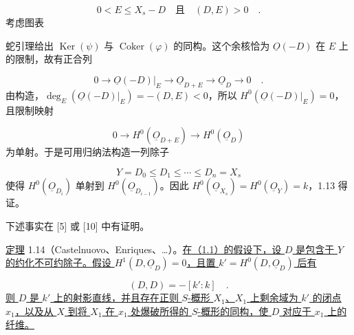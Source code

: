 \begin{equation*}
0<E\leq X_s-D \quad\text{且}\quad (D,E)>0 \quad .
\end{equation*}
考虑图表

\begin{center}
\end{center}
蛇引理给出 $\operatorname{Ker}(\psi)$ 与 $\operatorname{Coker}(\varphi)$ 的同构。这个余核恰为 $\underline{O}(-D)$ 在 $E$ 上的限制，故有正合列

\begin{equation*}
0\longrightarrow\underline{O}(-D)|_E
\longrightarrow\underline{O}_{D+E}
\longrightarrow\underline{O}_D\longrightarrow0 \quad .
\end{equation*}
由构造，$\deg_E(\underline{O}(-D)|_E)=-(D,E)<0$，所以 $H^0(\underline{O}(-D)|_E)=0$，且限制映射

\begin{equation*}
0\longrightarrow H^0(\underline{O}_{D+E})
\longrightarrow H^0(\underline{O}_D)
\end{equation*}
为单射。于是可用归纳法构造一列除子

\begin{equation*}
Y=D_0\leq D_1\leq\cdots\leq D_n=X_s
\end{equation*}
使得 $H^0(\underline{O}_{D_i})$ 单射到 $H^0(\underline{O}_{D_{i-1}})$。因此 $H^0(\underline{O}_{X_s})=H^0(\underline{O}_Y)=k$，1.13 得证。


下述事实在 [5] 或 [10] 中有证明。

\underline{定理} 1.14（Castelnuovo、Enriques、\ldots）。\underline{在（1.1）的假设下，设 $D$ 是包含于 $Y$ 的约化不可约除子。假设 $H^1(D,\underline{O}_D)=0$，且置 $k'=H^0(D,\underline{O}_D)$ 后有}

\begin{equation*}
(D,D)=-[k':k] \quad .
\end{equation*}
\underline{则 $D$ 是 $k'$ 上的射影直线，并且存在正则 $S$-概形 $X_1$、$X_1$ 上剩余域为 $k'$ 的闭点 $x_1$，以及从 $X$ 到将 $X_1$ 在 $x_1$ 处爆破所得的 $S$-概形的同构，使 $D$ 对应于 $x_1$ 上的纤维。}

